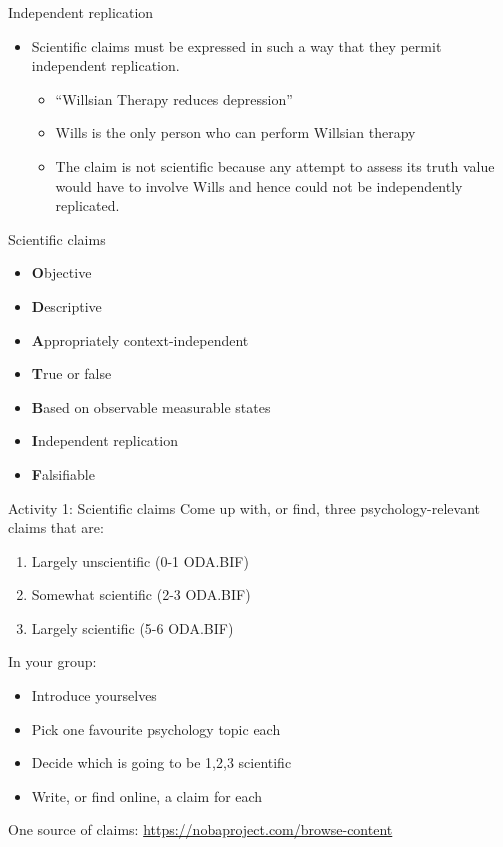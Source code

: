 \documentclass{beamer}
\begin{document}
\begin{frame}{Independent replication}
	\begin{itemize}
		\item Scientific claims must be expressed in such a way that they permit independent replication.
		\begin{itemize}
			\item ``Willsian Therapy reduces depression''
			\item Wills is the only person who can perform Willsian therapy
			\item The claim is not scientific because any attempt to assess its truth value would have to involve Wills and hence could not be independently replicated.
		\end{itemize}
	\end{itemize}
\end{frame}

\begin{frame}{Scientific claims}
	\begin{itemize}
		\item \textbf{O}bjective
		\item \textbf{D}escriptive 
		\item \textbf{A}ppropriately context-independent
		\item \textbf{T}rue or false	
		\item \textbf{B}ased on observable measurable states
		\item \textbf{I}ndependent replication
		\item \textbf{F}alsifiable
	\end{itemize}
\end{frame}

\begin{frame}{Activity 1: Scientific claims}
  Come up with, or find, three psychology-relevant claims that are:
  \begin{enumerate}
    \item Largely unscientific (0-1 ODA.BIF)
    \item Somewhat scientific (2-3 ODA.BIF)
    \item Largely scientific (5-6 ODA.BIF)
  \end{enumerate}
  In your group:
  \begin{itemize}
  \item Introduce yourselves
  \item Pick one favourite psychology topic each
  \item Decide which is going to be 1,2,3 scientific
  \item Write, or find online, a claim for each
  \end{itemize}
  One source of claims: \url{https://nobaproject.com/browse-content}  
\end{frame}
\end{document}
